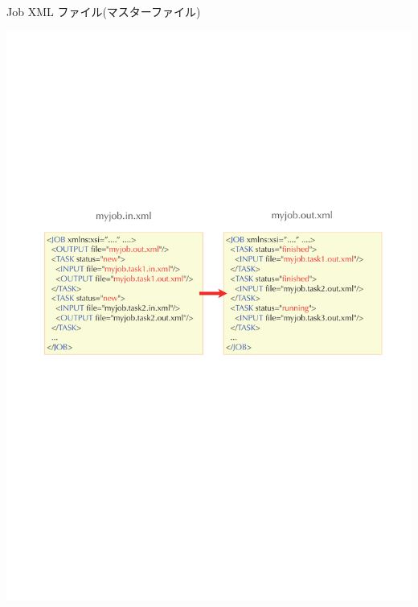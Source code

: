 \subsection*{\redm\whiteb\greenb}
\begin{frame}{Job XML ファイル(マスターファイル)}
  \begin{center}
    \includegraphics[height=.6\textheight]{simulation2.pdf}
  \end{center}
\end{frame}

